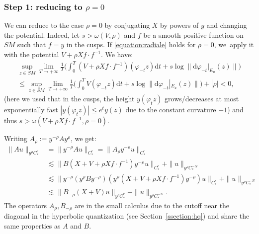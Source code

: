 \documentclass[JEP,XML,SOM,Unicode,NoFloatCountersInSection]{cedram}
\newcommand{\dd}{\mathrm{d}}
\theoremstyle{plain}
\theoremstyle{definition}
\begin{document}
\subsubsection*{Step 1: reducing to $\rho=0$} We can reduce to the case $\rho = 0$ by conjugating $X$ by powers of $y$ and changing the potential. Indeed, let $s > \omega(V,\rho)$ and $f$ be a smooth positive function on $SM$ such that $f = y$ in the cusps. If \eqref{equation:radiale} holds for $\rho=0$, we~apply it with the potential $V + \rho Xf \cdot f^{-1}$. We have:
\begin{multline*}
\sup_{z \in SM} \lim_{T \to +\infty} \frac{1}{T} \biggl(\int_0^T (V+ \rho Xf \cdot f^{-1})(\varphi_{-t} z) \dd t + s \log \|\dd \varphi_{-t}|_{E_u}(z)\| \biggr) \\
\leq \sup_{z \in SM} \lim_{T \to +\infty} \frac{1}{T}\biggl(\int_0^T V(\varphi_{-t} z) \dd t + s \log \|\dd \varphi_{-t}|_{E_u}(z)\| \biggr) +|\rho| < 0,
\end{multline*}
(here we used that in the cusps, the height $y(\varphi_tz)$ grows/decreases at most exponentially fast \ie $|y(\varphi_t z)| \leq e^t y(z)$ due to the constant curvature $-1$) and thus $s > \omega(V+ \rho Xf \cdot f^{-1},\rho=0)$.

Writing $A_\rho := y^{-\rho}Ay^\rho$, we get:
\[
\begin{split}
\|Au \|_{y^\rho C^r_*} & = \|y^{-\rho}Au\|_{C^r_*} = \|A_\rho y^{-\rho} u\|_{C^r_*} \\
& \lesssim \|B (X+V+ \rho Xf \cdot f^{-1}) y^{-\rho} u\|_{C^r_*} + \|u\|_{y^\rho C^{-N}_*} \\
& \lesssim \|y^{-\rho} (y^\rho B y^{-\rho}) \left(y^{\rho} (X+V+\rho Xf \cdot f^{-1}) y^{-\rho}\right) u\|_{C^r_*} + \|u\|_{y^\rho C^{-N}_*} \\
& \lesssim \|B_{-\rho} (X + V) u\|_{y^\rho C^r_*} + \|u\|_{y^\rho C^{-N}_*}.
\end{split}
\]
The operators $A_\rho,B_{-\rho}$ are in the small calculus due to the cutoff near the diagonal in the hyperbolic quantization (see Section~\ref{ssection:hq}) and share the same properties as $A$ and $B$.
\end{document}
